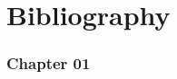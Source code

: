 \chapter{Bibliography}

\subsection*{Chapter 01}

\begin{refsection}[ch01_chapter1]
    \nocite{*}
    \printbibliography[heading=none]
\end{refsection}
